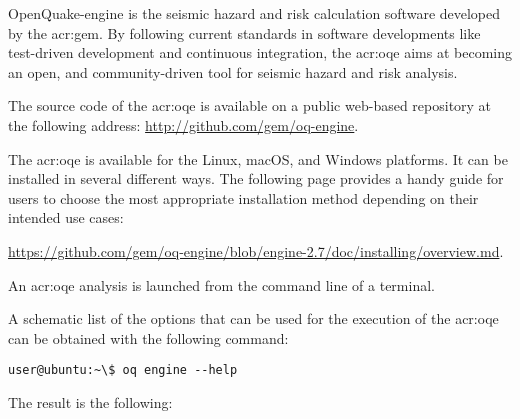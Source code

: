OpenQuake-engine is the seismic hazard and risk calculation software developed by
the \glsdesc{acr:gem}. By following current standards in software
developments like test-driven development and continuous integration, the
\glsdesc{acr:oqe} aims at becoming an open, and community-driven tool for
seismic hazard and risk analysis.

The source code of the \glsdesc{acr:oqe} is available on a public web-based
repository at the following address:
\href{http://github.com/gem/oq-engine}{http://github.com/gem/oq-engine}.

The \glsdesc{acr:oqe} is available for the Linux, macOS, and Windows
platforms. It can be installed in several different ways. The following page
provides a handy guide for users to choose the most appropriate installation
method depending on their intended use cases:

\href{https://github.com/gem/oq-engine/blob/engine-2.7/doc/installing/overview.md}{https://github.com/gem/oq-engine/blob/engine-2.7/doc/installing/overview.md}.

An \gls{acr:oqe} analysis is launched from the command line of a terminal.

A schematic list of the options that can be used for the execution of the
\gls{acr:oqe} can be obtained with the following command:

\begin{verbatim}
user@ubuntu:~\$ oq engine --help
\end{verbatim}

The result is the following:
\inputminted[firstline=1,fontsize=\footnotesize,frame=single]{shell-session}{oqum/help.txt}
